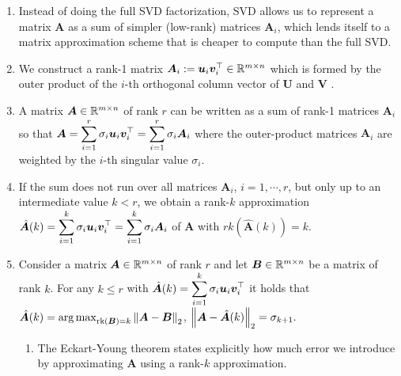 \begin{enumerate}
    \item Instead of doing the full SVD factorization, SVD allows us to represent a matrix $\bm{A}$ as a sum of simpler (low-rank) matrices $\bm{A}_i$, which lends itself to a matrix approximation scheme that is cheaper to compute than the full SVD.
    \hfill \cite{mfml/book/mml/Deisenroth-Faisal-Ong}

    \item We construct a rank-1 matrix 
    $
        \bm{A}_i
        := \bm{u}_i \bm{v}_i^\top 
        \in \mathbb{R}^{m\times n}
    $
    which is formed by the outer product of the $i$-th orthogonal column vector of $\bm{U}$ and $\bm{V}$ .
    \hfill \cite{mfml/book/mml/Deisenroth-Faisal-Ong}

    \item A matrix $\bm{A} \in \mathbb{R}^{m\times n}$ of rank $r$ can be written as a sum of rank-1 matrices $\bm{A}_i$ so that 
    $
        \bm{A} 
        = \displaystyle\sum_{i=1}^r \sigma_i \bm{u}_i \bm{v}_i^\top
        = \displaystyle\sum_{i=1}^r \sigma_i \bm{A}_i
    $
    where the outer-product matrices $\bm{A}_i$ are weighted by the $i$-th singular value $\sigma_i$. 
    \hfill \cite{mfml/book/mml/Deisenroth-Faisal-Ong}

    \item If the sum does not run over all matrices $\bm{A}_i$, $i = 1, \cdots , r$, but only up to an intermediate value $k < r$, we obtain a rank-$k$ approximation
    $
        \hat{\bm{A}}(k) 
        = \displaystyle\sum_{i=1}^k \sigma_i \bm{u}_i \bm{v}_i^\top
        = \displaystyle\sum_{i=1}^k \sigma_i \bm{A}_i
    $
    of $\bm{A}$ with $rk(\hat{\bm{A}}(k)) = k$. 
    \hfill \cite{mfml/book/mml/Deisenroth-Faisal-Ong}

    \item \begin{theorem}
        Consider a matrix $\bm{A} \in \mathbb{R}^{m\times n}$ of rank $r$ and let $\bm{B} \in \mathbb{R}^{m\times n}$ be a matrix of rank $k$. 
        For any $k \leq r$ with $\hat{\bm{A}}(k) = \displaystyle\sum^k_{i=1} \sigma_i \bm{u}_i \bm{v}_i^\top$ it holds that
        ${
            \displaystyle
            \hat{\bm{A}}(k)
            = {\arg\max}_{\text{rk}(\bm{B})=k} \left\| \bm{A} - \bm{B} \right\|_2
        }$,
        \hspace{0.5cm}
        ${
            \displaystyle
            \left\| \bm{A} - \hat{\bm{A}}(k) \right\|_2 = \sigma_{k+1}.
        }$
        \hfill \cite{mfml/book/mml/Deisenroth-Faisal-Ong}
    \end{theorem}
    \begin{enumerate}
        \item The Eckart-Young theorem states explicitly how much error we introduce by approximating $\bm{A}$ using a rank-$k$ approximation.
        \hfill \cite{mfml/book/mml/Deisenroth-Faisal-Ong}


\end{enumerate}
\end{enumerate}
